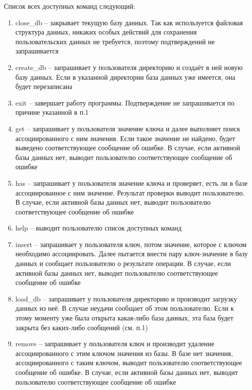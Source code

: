\documentclass[12pt, a4paper]{fallen_report}
\begin{document}
Список всех доступных команд следующий: 
\begin{enumerate}
\item {\consolas close\_db} – закрывает текущую базу данных. Так как используется файловая структура данных, никаких особых действий для сохранения пользовательских данных не требуется, поэтому подтверждений не запрашивается

\item {\consolas create\_db} – запрашивает у пользователя директорию и создаёт в ней новую базу данных. Если в указанной директории база данных уже имеется, она будет перезаписана

\item {\consolas exit} – завершает работу программы. Подтверждение не запрашивается по причине указанной в п.1

\item {\consolas get} – запрашивает у пользователя значение ключа и далее выполняет поиск ассоциированного с ним значения. Если такое значение не найдено, будет выведено соответствующее сообщение об ошибке. В случае, если активной базы данных нет, выводит пользователю соответствующее сообщение об ошибке

\item {\consolas has} – запрашивает у пользователя значение ключа и проверяет, есть ли в базе ассоциированное с ним значение. Результат проверки выводит пользователю. В случае, если активной базы данных нет, выводит пользователю соответствующее сообщение об ошибке

\item {\consolas help} – выводит пользователю список доступных команд

\item {\consolas insert} – запрашивает у пользователя ключ, потом значение, которое с ключом необходимо ассоциировать. Далее пытается внести пару ключ-значение в базу данных и сообщает пользователю о результате операции. В случае, если активной базы данных нет, выводит пользователю соответствующее сообщение об ошибке

\item {\consolas load\_db} – запрашивает у пользователя директорию и производит загрузку данных из неё. В случае неудачи сообщает об этом пользователю. Если к этому моменту уже была открыта какая-либо база данных, эта база будет закрыта без каких-либо сообщений (см. п.1)

\item {\consolas remove} – запрашивает у пользователя ключ и производит удаление ассоциированного с этим ключом значения из базы. В базе нет значения, ассоциированного с таким ключом, выводит пользователю соответствующее сообщение об ошибке. В случае, если активной базы данных нет, выводит пользователю соответствующее сообщение об ошибке


\end{enumerate}
\end{document}
